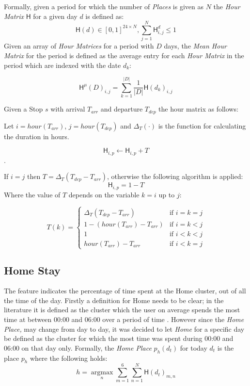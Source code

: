 Formally, given a period for which the number of \textit{Places} is given as $N$ the \textit{Hour Matrix} $\mathsf{H}$ for a given day $d$ is defined as:
$$\mathsf{H}(d) \in [0,1]^{24 \times N}, \sum_{j=1}^N \mathsf{H}^d_{i,j} \leq 1$$
Given an array of \textit{Hour Matrices} for a period with $D$ days, the \textit{Mean Hour Matrix} for the period is defined as the average entry for each \textit{Hour Matrix} in the period which are indexed with the date $d_k$:

$$\mathsf{H}^{\mu} (D) _{i,j} = \sum_{k=1}^{|D|} \frac{1}{|D|} \mathsf{H}(d_k)_{i,j}$$

Given a Stop $s$ with arrival $T_{arr}$ and departure $T_{dep}$ the hour matrix as follows:

Let $i = hour(T_{arr})$, $j = hour(T_{dep})$ and $\Delta_ T(\cdot)$ is the function for calculating the duration in hours.

$$\mathsf{H}_{i,p} \leftarrow \mathsf{H}_{i,p} + T$$. 

If $i = j$ then $T = \Delta_T (T_{dep} - T_{arr})$, otherwise the following algorithm is applied:\\

$$\mathsf{H}_{i,p} = 1 - T$$
Where the value of $T$ depends on the variable $k = i$ up to $j$:

\[
  T(k) =
  \begin{cases}
\Delta_T (T_{dep} - T_{arr})            & \text{if $i = k = j$} \\
1 - (hour(T_{arr}) - T_{arr}) & \text{if $i = k < j$} \\
1                                       & \text{if $i < k < j$} \\
hour(T_{arr}) - T_{arr}       & \text{if $i < k = j$}
  \end{cases}
\]

\subsection{Home Stay}
The  feature indicates the percentage of time spent at the Home cluster, out of all the time of the day. Firstly a definition for Home needs to be clear; in the literature it is defined as the cluster which the user on average spends the most time at between 00:00 and 06:00 over a period of time \cite{Saeb2015, Canzian2015}. However since the \textit{Home Place,} may change from day to day, it was decided to let \textit{Home} for a specific day be defined as the cluster for which the most time was spent during 00:00 and 06:00 on that day only. Formally, the \textit{Home Place} $p_h (d_t)$ for today $d_t$ is the place $p_h$ where the following holds:
$$h = \operatorname*{argmax}_n \sum_{m=1}^{6} \sum_{n=1}^{N}  \mathsf{H}(d_t)_{m,n}$$

